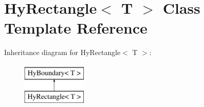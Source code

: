 \hypertarget{classHyRectangle}{
\section{HyRectangle$<$ T $>$ Class Template Reference}
\label{classHyRectangle}
}
Inheritance diagram for HyRectangle$<$ T $>$:\begin{figure}[H]
\begin{center}
\leavevmode
\includegraphics[height=2cm]{classHyRectangle}
\end{center}
\end{figure}
